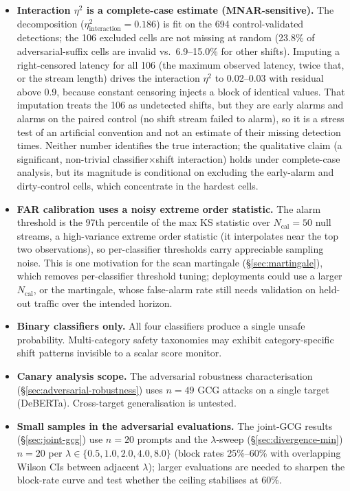 \documentclass{article}
\begin{document}
\begin{itemize}
\item \textbf{Interaction $\eta^2$ is a complete-case estimate (MNAR-sensitive).} The decomposition ($\eta^2_{\text{interaction}}=0.186$) is fit on the 694 control-validated detections; the 106 excluded cells are not missing at random (23.8\% of adversarial-suffix cells are invalid vs.\ 6.9--15.0\% for other shifts). Imputing a right-censored latency for all 106 (the maximum observed latency, twice that, or the stream length) drives the interaction $\eta^2$ to 0.02--0.03 with residual above 0.9, because constant censoring injects a block of identical values. That imputation treats the 106 as undetected shifts, but they are early alarms and alarms on the paired control (no shift stream failed to alarm), so it is a stress test of an artificial convention and not an estimate of their missing detection times. Neither number identifies the true interaction; the qualitative claim (a significant, non-trivial classifier$\times$shift interaction) holds under complete-case analysis, but its magnitude is conditional on excluding the early-alarm and dirty-control cells, which concentrate in the hardest cells.
\item \textbf{FAR calibration uses a noisy extreme order statistic.} The alarm threshold is the 97th percentile of the max KS statistic over $N_{\text{cal}}=50$ null streams, a high-variance extreme order statistic (it interpolates near the top two observations), so per-classifier thresholds carry appreciable sampling noise. This is one motivation for the scan martingale (\S\ref{sec:martingale}), which removes per-classifier threshold tuning; deployments could use a larger $N_{\text{cal}}$, or the martingale, whose false-alarm rate still needs validation on held-out traffic over the intended horizon.
\item \textbf{Binary classifiers only.} All four classifiers produce a single unsafe probability. Multi-category safety taxonomies may exhibit category-specific shift patterns invisible to a scalar score monitor.
\item \textbf{Canary analysis scope.} The adversarial robustness characterisation (\S\ref{sec:adversarial-robustness}) uses $n = 49$ GCG attacks on a single target (DeBERTa). Cross-target generalisation is untested.
\item \textbf{Small samples in the adversarial evaluations.} The joint-GCG results (\S\ref{sec:joint-gcg}) use $n = 20$ prompts and the $\lambda$-sweep (\S\ref{sec:divergence-min}) $n = 20$ per $\lambda \in \{0.5, 1.0, 2.0, 4.0, 8.0\}$ (block rates 25\%--60\% with overlapping Wilson CIs between adjacent $\lambda$); larger evaluations are needed to sharpen the block-rate curve and test whether the ceiling stabilises at 60\%.

\end{itemize}
\end{document}
